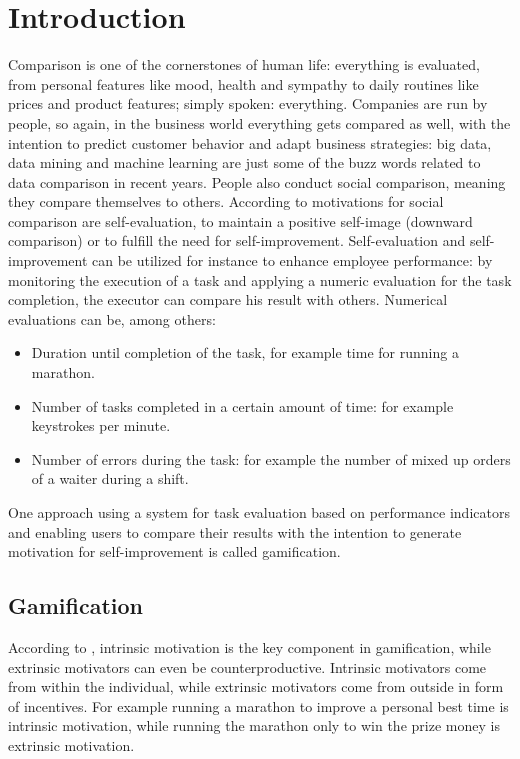 \chapter{Introduction} \label{Introduction}


Comparison is one of the cornerstones of human life: everything is evaluated, from personal features like mood, health and sympathy to daily routines like prices and product features; simply spoken: everything. Companies are run by people, so again, in the business world everything gets compared as well, with the intention to predict customer behavior and adapt business strategies: big data, data mining and machine learning are just some of the buzz words related to data comparison in recent years.
People also conduct social comparison, meaning they compare themselves to others. According to \textcite{Corcoran2011} motivations for social comparison are self-evaluation, to maintain a positive self-image (downward comparison) or to fulfill the need for self-improvement.
Self-evaluation and self-improvement can be utilized for instance to enhance employee performance: by monitoring the execution of a task and applying a numeric evaluation for the task completion, the executor can compare his result with others.
Numerical evaluations can be, among others:
\begin{itemize}
	\item Duration until completion of the task, for example time for running a marathon.
	\item Number of tasks completed in a certain amount of time: for example keystrokes per minute.
	\item Number of errors during the task: for example the number of mixed up orders of a waiter during a shift.
\end{itemize}
One approach using a system for task evaluation based on performance indicators and enabling users to compare their results with the intention to generate motivation for self-improvement is called gamification. 

\section{Gamification} \label{Gamification}

According to \textcite{Herger2015}, intrinsic motivation is the key component in gamification, while extrinsic motivators can even be counterproductive. Intrinsic motivators come from within the individual, while extrinsic motivators come from outside in form of incentives. For example running a marathon to improve a personal best time is intrinsic motivation, while running the marathon only to win the prize money is extrinsic motivation.

